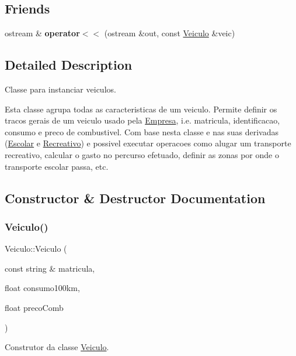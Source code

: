 \subsection*{Friends}
\begin{DoxyCompactItemize}
\item 
\mbox{\label{class_veiculo_ae5cee715fe9d5928eb95e7d3e5aef756}} 
ostream \& {\bfseries operator$<$$<$} (ostream \&out, const \mbox{\hyperlink{class_veiculo}{Veiculo}} \&veic)
\end{DoxyCompactItemize}


\subsection{Detailed Description}
Classe para instanciar veiculos. 

Esta classe agrupa todas as caracteristicas de um veiculo. Permite definir os tracos gerais de um veiculo usado pela \mbox{\hyperlink{class_empresa}{Empresa}}, i.\+e. matricula, identificacao, consumo e preco de combustivel. Com base nesta classe e nas suas derivadas (\mbox{\hyperlink{class_escolar}{Escolar}} e \mbox{\hyperlink{class_recreativo}{Recreativo}}) e possivel executar operacoes como alugar um transporte recreativo, calcular o gasto no percurso efetuado, definir as zonas por onde o transporte escolar passa, etc. 

\subsection{Constructor \& Destructor Documentation}
\mbox{\label{class_veiculo_a49f6527e767c1ca17a56c84729563ade}} 
\subsubsection{\texorpdfstring{Veiculo()}{Veiculo()}}
{\footnotesize\ttfamily Veiculo\+::\+Veiculo (\begin{DoxyParamCaption}\item[{const string \&}]{matricula,  }\item[{float}]{consumo100km,  }\item[{float}]{preco\+Comb }\end{DoxyParamCaption})}



Construtor da classe \mbox{\hyperlink{class_veiculo}{Veiculo}}. 


